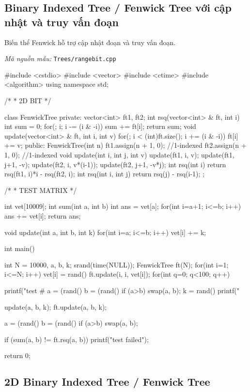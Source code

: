 \documentclass[11pt]{article}
\newcommand{\codepath}[1]{\par\noindent\textit{Mã nguồn mẫu:} \texttt{#1}\par}
\begin{document}
\subsection{Binary Indexed Tree / Fenwick Tree với cập nhật và truy vấn đoạn}

Biến thể Fenwick hỗ trợ cập nhật đoạn và truy vấn đoạn.

\codepath{Trees/rangebit.cpp}

\begingroup\scriptsize
\begin{vncode}
#include <cstdio>
#include <vector>
#include <ctime>
#include <algorithm>
using namespace std;

/*
 * 2D BIT
 */

class FenwickTree {
private:
	vector<int> ft1, ft2;
	int rsq(vector<int> & ft, int i) {
		int sum = 0;
		for(; i; i -= (i & -i)) sum += ft[i];
		return sum;
	}
	void update(vector<int> & ft, int i, int v) {
		for(; i < (int)ft.size(); i += (i & -i))
			ft[i] += v;
	}
public:
	FenwickTree(int n) {
		ft1.assign(n + 1, 0); //1-indexed
		ft2.assign(n + 1, 0); //1-indexed
	}
	void update(int i, int j, int v) {
		update(ft1, i, v);
		update(ft1, j+1, -v);
		update(ft2, i, v*(i-1));
		update(ft2, j+1, -v*j);
	}
	int rsq(int i) {
		return rsq(ft1, i)*i - rsq(ft2, i);
	}
	int rsq(int i, int j) {
		return rsq(j) - rsq(i-1);
	}
};

/*
 * TEST MATRIX
 */

int vet[10009];
int sum(int a, int b) {
	int ans = vet[a];
	for(int i=a+1; i<=b; i++) ans += vet[i];
	return ans;
}

void update(int a, int b, int k) {
	for(int i=a; i<=b; i++) vet[i] += k;
}


int main() {
	int N = 10000, a, b, k;
	srand(time(NULL));
	FenwickTree ft(N);
	for(int i=1; i<=N; i++) {
		vet[i] = rand()%
		ft.update(i, i, vet[i]);
	}
	for(int q=0; q<100; q++) {

		printf("test #%
		a = (rand()%
		b = (rand()%
		if (a>b) swap(a, b);
		k = rand()%
		printf(" %

		update(a, b, k);
		ft.update(a, b, k);

		a = (rand()%
		b = (rand()%
		if (a>b) swap(a, b);

		if (sum(a, b) != ft.rsq(a, b)) printf("test failed\n");
	}
	return 0;
}
\end{vncode}
\endgroup


\subsection{2D Binary Indexed Tree / Fenwick Tree}
\end{document}
